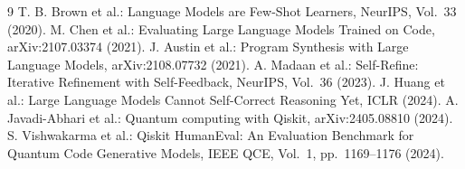 \documentclass[a4paper,8pt,twocolumn]{extarticle}
\begin{document}
\begin{thebibliography}{9}
T. B. Brown et al.: Language Models are Few-Shot Learners, NeurIPS, Vol.~33 (2020).
M. Chen et al.: Evaluating Large Language Models Trained on Code, arXiv:2107.03374 (2021).
J. Austin et al.: Program Synthesis with Large Language Models, arXiv:2108.07732 (2021).
A. Madaan et al.: Self-Refine: Iterative Refinement with Self-Feedback, NeurIPS, Vol.~36 (2023).
J. Huang et al.: Large Language Models Cannot Self-Correct Reasoning Yet, ICLR (2024).
A. Javadi-Abhari et al.: Quantum computing with Qiskit, arXiv:2405.08810 (2024).
S. Vishwakarma et al.: Qiskit HumanEval: An Evaluation Benchmark for Quantum Code Generative Models, IEEE QCE, Vol.~1, pp.~1169--1176 (2024).
\end{thebibliography}
\end{document}
